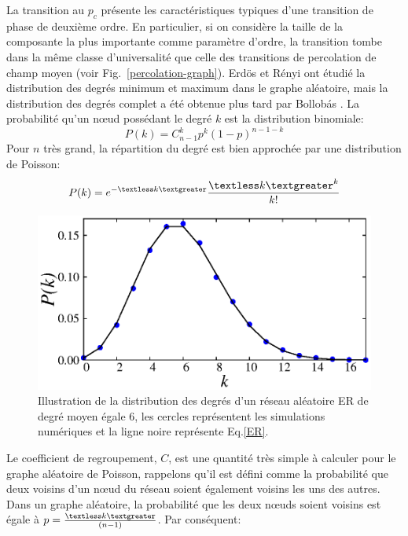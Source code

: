 La transition au $p_c$ présente les caractéristiques typiques d'une transition de phase de deuxième ordre. En particulier, si on considère la taille de la composante la plus importante comme paramètre d'ordre, la transition tombe dans la même classe d'universalité que celle des transitions de percolation de champ moyen (voir Fig.~\ref{percolation-graph}). Erdös et Rényi ont étudié la distribution des degrés minimum et maximum dans le graphe aléatoire, mais la distribution des degrés complet a été obtenue plus tard par Bollobás \cite{Bollobas1998}. La probabilité qu'un nœud possédant le degré  $k$ est la distribution binomiale:
\begin{equation}
P(k)=C^k_{n-1}p^k(1-p)^{n-1-k}
\end{equation}
 Pour $n$ très grand, la répartition du degré est bien approchée par une distribution de Poisson:
 \begin{equation}
 P(k)=e^{-\textless k\textgreater}\dfrac{\textless k\textgreater^k}{k!}
 \label{ER}
 \end{equation}
\begin{figure}[h!]
	\centering
	\includegraphics[scale=1]{./figures/fig-ER-dist}
	\caption{Illustration de la distribution des degrés d'un réseau aléatoire ER de degré moyen égale $6$, les cercles représentent les simulations numériques et la ligne noire représente Eq.\ref{ER}.}
	
	\label{ER-distribution}
\end{figure} 

 Le coefficient de regroupement, $C$, est une quantité très simple à calculer pour le graphe aléatoire de Poisson, rappelons qu'il est défini comme la probabilité que deux voisins d'un nœud du réseau soient également voisins les uns des autres. Dans un graphe aléatoire, la probabilité que les deux nœuds soient voisins est égale à $p=\frac{\textless k\textgreater}{(n - 1)}$. Par conséquent:
 
